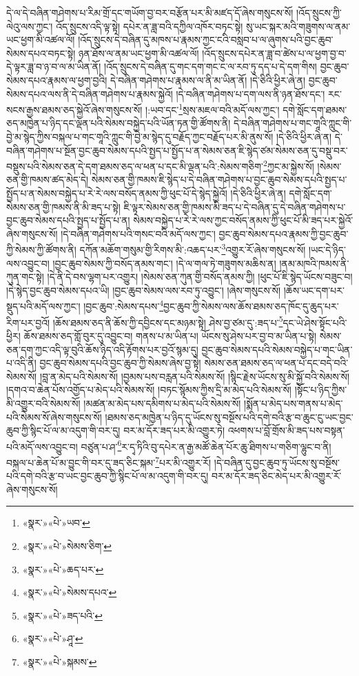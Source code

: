 དེ་ལ་དེ་བཞིན་གཤེགས་པ་རིམ་གྲོ་དང་གཡོག་བྱ་བར་བརྩོན་པར་མི་མཛད་དོ་ཞེས་གསུངས་སོ། །འོད་སྲུངས་ཀྱི་ལེའུ་ལས་ཀྱང་། འོད་སྲུངས་འདི་ལྟ་སྟེ། དཔེར་ན་ཟླ་བའི་དཀྱིལ་འཁོར་བཏང་སྟེ། སུ་ཡང་སྐར་མའི་གཟུགས་ལ་ནམ་ཡང་ཕྱག་མི་འཚལ་ལོ། །འོད་སྲུངས་དེ་བཞིན་དུ་མཁས་པ་རྣམས་ཀྱང་ངའི་བསླབ་པ་ལ་ཞུགས་པའི་བྱང་ཆུབ་སེམས་དཔའ་བཏང་སྟེ། ཉན་ཐོས་ལ་ནམ་ཡང་ཕྱག་མི་འཚལ་ལོ། །འོད་སྲུངས་དཔེར་ན་ཟླ་བ་ཚེས་པ་ལ་ཕྱག་བྱ་བ་དེ་ལྟར་ཟླ་བ་ཉ་བ་ལ་མ་ཡིན་ནོ། །འོད་སྲུངས་དེ་བཞིན་དུ་གང་དག་གང་ང་ལ་རབ་ཏུ་དད་པ་དེ་དག་གིས། བྱང་ཆུབ་སེམས་དཔའ་རྣམས་ལ་ཕྱག་བྱའི། དེ་བཞིན་གཤེགས་པ་རྣམས་ལ་ནི་མ་ཡིན་ནོ། །དེ་ཅིའི་ཕྱིར་ཞེ་ན། བྱང་ཆུབ་སེམས་དཔའ་ལས་ནི་དེ་བཞིན་གཤེགས་པ་རྣམས་སྐྱེའོ། །དེ་བཞིན་གཤེགས་པ་དག་ལས་ནི་ཉན་ཐོས་དང་། རང་སངས་རྒྱས་ཐམས་ཅད་སྐྱེའོ་ཞེས་གསུངས་སོ། །:ཡབ་དང་\footnote{«སྣར་»«པེ་»ཡབ་}སྲས་མཇལ་བའི་མདོ་ལས་ཀྱང་། དགེ་སློང་དག་ཐམས་ཅད་མཁྱེན་པ་ཉིད་དང་ལྡན་པའི་སེམས་བསྐྱེད་པའི་ཡོན་ཏན་གྱི་ཚོགས་ནི། དེ་བཞིན་གཤེགས་པ་གང་གཱའི་ཀླུང་གི་བྱེ་མ་སྙེད་ཀྱིས་བསྐལ་པ་གང་གཱའི་ཀླུང་གི་བྱེ་མ་སྙེད་དུ་བརྗོད་ཀྱང་བརྗོད་པར་མི་ནུས་སོ། །དེ་ཅིའི་ཕྱིར་ཞེ་ན། དེ་བཞིན་གཤེགས་པ་སྔོན་བྱང་ཆུབ་སེམས་དཔའི་སྤྱད་པ་སྤྱོད་པ་ན་སེམས་ཅན་ཇི་སྙེད་ཙམ་སེམས་ཅན་དུ་བསྡུ་བར་བསྡུས་པའི་སེམས་ཅན་དེ་དག་ཐམས་ཅད་ལ་ཕན་པ་དང་མི་ལྡན་པའི་:སེམས་གཅིག་\footnote{«སྣར་»«པེ་»སེམས་ཅིག་}ཀྱང་མ་སྐྱེས་སོ། །སེམས་ཅན་གྱི་ཁམས་ཚད་མེད་དེ། སེམས་ཅན་གྱི་ཁམས་ཇི་སྙེད་པ་དེ་བཞིན་གཤེགས་པ་བྱང་ཆུབ་སེམས་དཔའི་སྤྱད་པ་སྤྱོད་པ་ན་སེམས་བསྐྱེད་པ་རེ་རེ་ལས་བསོད་ནམས་ཀྱི་ཕུང་པོ་དེ་སྙེད་སྐྱེའོ། །དེ་ཅིའི་ཕྱིར་ཞེ་ན། དགེ་སློང་དག་སེམས་ཅན་གྱི་ཁམས་ནི་མི་ཟད་པ་སྟེ། ཇི་ལྟར་སེམས་ཅན་གྱི་ཁམས་མི་ཟད་པ་དེ་བཞིན་དུ་དེ་བཞིན་གཤེགས་པ་བྱང་ཆུབ་སེམས་དཔའི་སྤྱད་པ་སྤྱོད་པ་ན། སེམས་བསྐྱེད་པ་རེ་རེ་ལས་ཀྱང་བསོད་ནམས་ཀྱི་ཕུང་པོ་མི་ཟད་པར་སྐྱེའོ་ཞེས་གསུངས་སོ། །དེ་བཞིན་གཤེགས་པའི་གསང་བའི་མདོ་ལས་ཀྱང་། བྱང་ཆུབ་སེམས་དཔའ་རྣམས་ཀྱི་བྱང་ཆུབ་ཀྱི་སེམས་ཀྱི་ཚོགས་ནི། དཀོན་མཆོག་གསུམ་གྱི་རིགས་མི་:འཆད་པར་\footnote{«སྣར་»«པེ་»ཆད་པར་}འགྱུར་རོ་ཞེས་གསུངས་སོ། །ཡང་དེ་ཉིད་ལས་འབྱུང་བ། །བྱང་ཆུབ་སེམས་ཀྱི་བསོད་ནམས་གང་། །དེ་ལ་གལ་ཏེ་གཟུགས་མཆིས་ན། །ནམ་མཁའི་ཁམས་ནི་ཀུན་གང་སྟེ། །དེ་ནི་དེ་བས་ལྷག་པར་འགྱུར། །སེམས་ཅན་ཀུན་གྱི་བསོད་ནམས་ཀྱི། །ཕུང་པོ་ཇི་སྙེད་ཡོངས་བཟུང་བ། །དེ་སྙེད་བྱང་ཆུབ་སེམས་དཔའ་ཡི། །བྱང་ཆུབ་སེམས་ལས་རབ་ཏུ་འབྱུང་། །ཞེས་གསུངས་སོ། །ཆོས་ཡང་དག་པར་སྡུད་པའི་མདོ་ལས་ཀྱང་། །བྱང་ཆུབ་:སེམས་དཔས་\footnote{«སྣར་»«པེ་»སེམས་དཔའ་}བྱང་ཆུབ་ཀྱི་སེམས་ལས་ཆོས་ཐམས་ཅད་ཁོང་དུ་ཆུད་པར་རིག་པར་བྱའོ། །ཆོས་ཐམས་ཅད་ནི་ཆོས་ཀྱི་དབྱིངས་དང་མཉམ་སྟེ། ཤེས་བྱ་ཙམ་དུ་:ཟད་པ་\footnote{«སྣར་»«པེ་»ཟད་པའི་}དང་ཡེ་ཤེས་སྟོང་པའི་ཕྱིར། ཆོས་ཐམས་ཅད་གློ་བུར་དུ་འབྱུང་བ། གནས་པ་མ་ཡིན་པ། ཡོངས་སུ་ཤེས་པར་བྱ་བ་མ་ཡིན་པ་སྟེ། སེམས་ཅན་དག་ཀྱང་འདི་ལྟ་བུའི་ཆོས་ཉིད་འདི་རྟོགས་པར་བྱའོ་སྙམ་དུ། བྱང་ཆུབ་སེམས་དཔའི་སེམས་བསྐྱེད་པ་གང་ཡིན་པ་འདི་ནི། བྱང་ཆུབ་སེམས་དཔའི་བྱང་ཆུབ་ཀྱི་སེམས་ཞེས་བྱ་སྟེ། སེམས་ཅན་ཐམས་ཅད་ལ་ཕན་པ་དང་བདེ་བའི་སེམས་སོ། །བླ་ན་མེད་པའི་སེམས་སོ། །བྱམས་པས་བརླན་པའི་སེམས་སོ། །སྙིང་རྗེས་ཡོངས་སུ་མི་སྐྱོ་བའི་སེམས་སོ། །དགའ་བ་ཆེན་པོས་འགྱོད་པ་མེད་པའི་སེམས་སོ། །བཏང་སྙོམས་ཀྱིས་དྲི་མ་མེད་པའི་སེམས་སོ། །སྟོང་པ་ཉིད་ཀྱིས་མི་འགྱུར་བའི་སེམས་སོ། །མཚན་མ་མེད་པས་དམིགས་པ་མེད་པའི་སེམས་སོ། །སྨོན་པ་མེད་པས་གནས་པ་མེད་པའི་སེམས་སོ་ཞེས་གསུངས་སོ། །ཐམས་ཅད་མཁྱེན་པ་ཉིད་དུ་ཡོངས་སུ་བསྔོས་པའི་དགེ་བའི་རྩ་བ་ཆུང་ངུ་ཡང་བྱང་ཆུབ་ཀྱི་སྙིང་པོ་ལ་མ་འདུག་གི་བར་དུ། བར་མ་དོར་ཟད་པར་མི་འགྱུར་ཏེ། འཕགས་པ་བློ་གྲོས་མི་ཟད་པས་བསྟན་པའི་མདོ་ལས་འབྱུང་བ། བཙུན་པ་ཤ་\footnote{«སྣར་»«པེ་»ཤཱ་}ར་དྭ་ཏིའི་བུ་དཔེར་ན་རྒྱ་མཚོ་ཆེན་པོར་ཆུ་ཐིགས་པ་གཅིག་ལྷུང་བ་ནི། བསྐལ་པ་ཆེན་པོ་མ་བྱུང་གི་བར་དུ་ཟད་ཅིང་སྐམ་\footnote{«སྣར་»«པེ་»སྐམས་}པར་མི་འགྱུར་རོ། །དེ་བཞིན་དུ་བྱང་ཆུབ་ཏུ་ཡོངས་སུ་བསྔོས་པའི་དགེ་བའི་རྩ་བ་ཡང་བྱང་ཆུབ་ཀྱི་སྙིང་པོ་ལ་མ་འདུག་གི་བར་དུ། བར་མ་དོར་ཟད་ཅིང་མེད་པར་མི་འགྱུར་རོ་ཞེས་གསུངས་སོ། 
